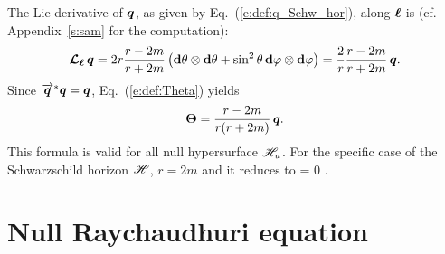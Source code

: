 {{\begin{example} \label{x:def:Schw_hor8}
The Lie derivative of $\bm{q}$, as given by Eq.~(\ref{e:def:q_Schw_hor}),
along $\bm{\ell}$ is (cf. Appendix~\ref{s:sam} for the computation):
\[
    \bm{\mathcal{L}}_{\bm{\bm{\ell}}}\, \bm{q} =  2 r \frac{r-2m}{r+2m} \left( \mathbf{d}\theta \otimes \mathbf{d}\theta
        +  \sin^2\theta \, \mathbf{d}\varphi \otimes \mathbf{d}\varphi \right) = \frac{2}{r} \frac{r-2m}{r+2m}
            \, \bm{q} .
\]
Since $\overrightarrow{\bm{q}}^* \bm{q} = \bm{q}$, Eq.~(\ref{e:def:Theta}) yields
\[
    \bm{\Theta} = \frac{r-2m}{r(r+2m)} \, \bm{q} .
\]
This formula is valid for all null hypersurface $\mathscr{H}_u$. For the specific
case of the Schwarzschild horizon $\mathscr{H}$, $r=2m$ and it reduces to
\be \label{e:def:Theta_zero_Schw_hor}
    \w{\Theta} = 0 .
\ee
\end{example}

\section{Null Raychaudhuri equation} \label{s:def:null_raychaud}

}}
